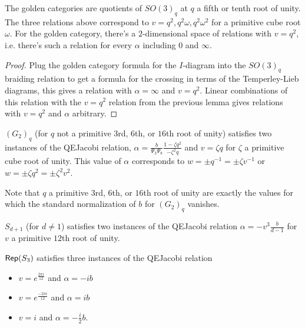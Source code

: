\documentclass[12pt]{amsart}
\begin{document}
\begin{lemma}
The golden categories are quotients of $SO(3)_q$ at $q$ a fifth or tenth root of unity.  The three relations above correspond to $v = q^2, q^2 \omega, q^2 \omega^2$ for a primitive cube root $\omega$.  For the golden category, there's a $2$-dimensional space of relations with $v = q^2$, i.e. there's such a relation for every $\alpha$ including $0$ and $\infty$.
 \end{lemma}
 \begin{proof}
Plug the golden category formula for the $I$-diagram into the $SO(3)_q$ braiding relation to get a formula for the crossing in terms of the Temperley-Lieb diagrams, this gives a relation with $\alpha=\infty$ and $v=q^2$.  Linear combinations of this relation with the $v = q^2$ relation from the previous lemma gives relations with $v = q^2$ and $\alpha$ arbitrary.
 \end{proof}

\begin{lemma}
$(G_2)_q$ (for $q$ not a primitive $3$rd, $6$th, or $16$th root of unity) satisfies two instances of the QEJacobi relation, $\alpha = \frac{b}{\Psi_3 \Psi_8} \frac{1-\zeta q^2}{-\zeta^2 q}$ and $v = \zeta q$ for $\zeta$ a primitive cube root of unity.  This value of $\alpha$ corresponds to $w = \pm q^{-1} = \pm \zeta v^{-1}$ or $w = \pm \zeta q^2 = \pm \zeta^2 v^2$.
\end{lemma}

Note that $q$ a primitive $3$rd, $6$th, or $16$th root of unity are exactly the values for which the standard normalization of $b$ for $(G_2)_q$ vanishes.

\begin{lemma}
$S_{d+1}$ (for $d \neq 1$) satisfies two instances of the QEJacobi relation $\alpha = -v^3 \frac{b}{d-1}$ for $v$ a primitive $12$th root of unity.
\end{lemma}

\begin{lemma}
$\operatorname{\mathsf{Rep}}(S_3)$ satisfies three instances of the QEJacobi relation
\begin{itemize}
\item $v = e^{\frac{2 \pi i}{12}}$ and $\alpha = -i b$
\item $v = e^{\frac{-2 \pi i}{12}}$ and $\alpha = i b$
\item $v = i$ and $\alpha = -\frac{i}{2} b$.
\end{itemize}
\end{lemma}
\end{document}

